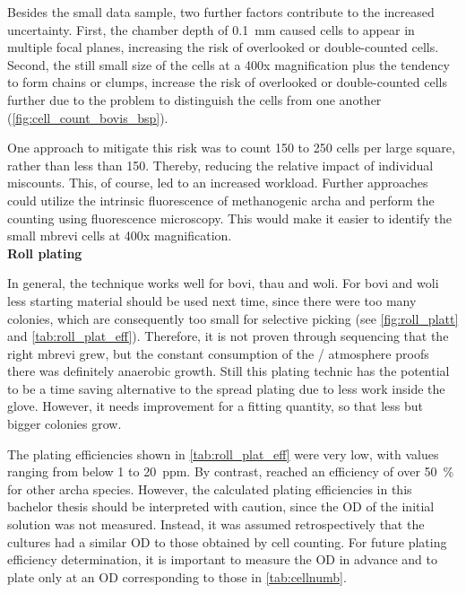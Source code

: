 Besides the small data sample, two further factors contribute to the increased uncertainty.
First, the chamber depth of 0.1~mm \parencite{lo-laboroptikgmbhZaehlkammer2026} caused cells to appear in multiple focal planes, increasing the risk of overlooked or double-counted cells.
Second, the still small size of the cells at a 400x magnification plus the tendency to form chains or clumps, increase the risk of overlooked or double-counted cells further due to the problem to distinguish the cells from one another (\cref{fig:cell_count_bovis_bsp}).

One approach to mitigate this risk was to count 150 to 250 cells per large square, rather than less than 150. Thereby, reducing the relative impact of individual miscounts. This, of course, led to an increased workload.
Further approaches could utilize the intrinsic fluorescence of methanogenic \gls{archa}  \parencite{lambrechtFlowCytometricQuantification2017} and perform the counting using fluorescence microscopy. This would make it easier to identify the small \acrlong{mbrevi} cells at 400x magnification.\\

\textbf{Roll plating}

\noindent In general, the technique works well for \acrshort{bovi}, \acrshort{thau} and \acrshort{woli}. For \acrshort{bovi} and \acrshort{woli} less starting material should be used next time, since there were too many colonies, which are consequently too small for selective picking (see \cref{fig:roll_platt} and \cref{tab:roll_plat_eff}). Therefore, it is not proven through sequencing that the right \acrlong{mbrevi} grew, but the constant consumption of the / atmosphere proofs there was definitely anaerobic growth.
Still this plating technic has the potential to be a time saving alternative to the spread plating due to less work inside the \gls{glove}. However, it needs improvement for a fitting quantity, so that less but bigger colonies grow. 

The plating efficiencies shown in \cref{tab:roll_plat_eff} were very low, with values ranging from below 1 to 20~ppm. By contrast, \textcite{apolinarioPlateColonizationMethanococcus1996} reached an efficiency of over 50~\% for other \gls{archa} species. However, the calculated plating efficiencies in this bachelor thesis should be interpreted with caution, since the \acrshort{OD} of the initial solution was not measured. Instead, it was assumed retrospectively that the cultures had a similar OD to those obtained by cell counting.
For future plating efficiency determination, it is important to measure the \acrshort{OD} in advance and to plate only at an \acrshort{OD} corresponding to those in \cref{tab:cellnumb}.

